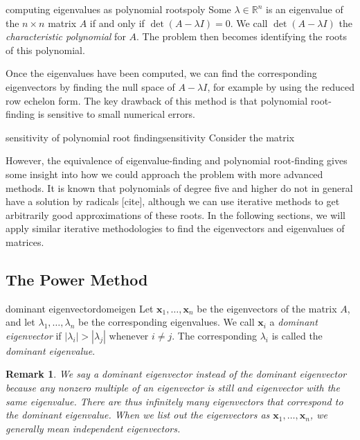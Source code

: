 \documentclass{article}
\newtheorem*{remark}{Remark}
\let\vec\mathbf
\begin{document}
\begin{theorem}{computing eigenvalues as polynomial roots}{poly}
  Some $\lambda \in \mathbb{R}^n$ is an eigenvalue of the $n \times n$ matrix $A$ if and only if $\det (A - \lambda I) = 0$. We call $\det (A - \lambda I)$ the \textit{characteristic polynomial} for $A$. The problem then becomes identifying the roots of this polynomial.
\end{theorem}

Once the eigenvalues have been computed, we can find the corresponding eigenvectors by finding the null space of $A - \lambda I$, for example by using the reduced row echelon form. The key drawback of this method is that polynomial root-finding is sensitive to small numerical errors.

\begin{example}{sensitivity of polynomial root finding}{sensitivity}
  Consider the matrix
\end{example}

However, the equivalence of eigenvalue-finding and polynomial root-finding gives some insight into how we could approach the problem with more advanced methods. It is known that polynomials of degree five and higher do not in general have a solution by radicals [cite], although we can use iterative methods to get arbitrarily good approximations of these roots. In the following sections, we will apply similar iterative methodologies to find the eigenvectors and eigenvalues of matrices.

\subsection{The Power Method}
\begin{definition}{dominant eigenvector}{domeigen}
  Let $\vec{x}_1, \ldots, \vec{x}_n$ be the eigenvectors of the matrix $A$, and let $\lambda_1, \ldots, \lambda_n$ be the corresponding eigenvalues. We call $\vec{x}_i$ a \textit{dominant eigenvector} if $|\lambda_i| > |\lambda_j|$ whenever $i \neq j$. The corresponding $\lambda_i$ is called the \textit{dominant eigenvalue}.
\end{definition}
\begin{remark}
  We say \emph{a} dominant eigenvector instead of \emph{the} dominant eigenvector because any nonzero multiple of an eigenvector is still and eigenvector with the same eigenvalue. There are thus infinitely many eigenvectors that correspond to the dominant eigenvalue. When we list out the eigenvectors as $\vec{x}_1, \ldots, \vec{x}_n$, we generally mean independent eigenvectors.
\end{remark}
\end{document}
